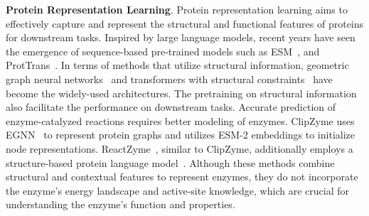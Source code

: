 \textbf{Protein Representation Learning}. 
Protein representation learning aims to effectively capture and represent the structural and functional features of proteins for downstream tasks. Inspired by large language models, recent years have seen the emergence of sequence-based pre-trained models such as ESM~\cite{brandes2022proteinbert}, and ProtTrans~\cite{elnaggar2021prottrans}. In terms of methods that utilize structural information, geometric graph neural networks~\cite{jing2020learning, satorras2021n, zhang2022protein} and transformers with structural constraints~\cite{ying2021transformers, TransformerM} have become the widely-used architectures. The pretraining on structural information also facilitate the performance on downstream tasks. Accurate prediction of enzyme-catalyzed reactions requires better modeling of enzymes. ClipZyme\cite{ClipZyme} uses EGNN~\cite{satorras2021n} to represent protein graphs and utilizes ESM-2 embeddings to initialize node representations. ReactZyme~\cite{ReactZyme}, similar to ClipZyme, additionally employs a structure-based protein language model~\cite{su2023saprot}. Although these methods combine structural and contextual features to represent enzymes, they do not incorporate the enzyme’s energy landscape and active-site knowledge, which are crucial for understanding the enzyme’s function and properties.


